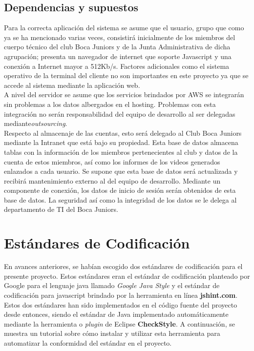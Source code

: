\documentclass[a4paper]{article}
\newcommand\tab[1][0.55cm]{\hspace*{#1}}
\begin{document}
{\color{Blue}
\subsection{Dependencias y supuestos}
\color{black}  %
\justify 

	\tab Para la correcta aplicación del sistema se asume que el usuario, grupo que como ya se ha mencionado varias veces, consistirá inicialmente de los miembros del cuerpo técnico del club Boca Juniors y de la Junta Administrativa de dicha agrupación;  presenta un navegador de internet que soporte Javascript y una conexión a Internet mayor a 512Kb/s. Factores adicionales como el sistema operativo de la terminal del cliente no son importantes en este proyecto ya que se accede al sistema mediante la aplicación web. \\
    
    A nivel del servidor se asume que los servicios brindados por AWS se integrarán sin problemas a los datos albergados en el hosting. Problemas con esta integración no serán responsabilidad del equipo de desarrollo al ser delegadas mediante\textit{outsourcing}. \\
    
    Respecto al almacenaje de las cuentas, esto será delegado al Club Boca Juniors mediante la Intranet que está bajo su propiedad. Esta base de datos almacena tablas con la información de los miembros pertenecientes al club y datos de la cuenta de estos miembros, así como los informes de los videos generados enlazados a cada usuario. Se supone que esta base de datos será actualizada y recibirá mantenimiento externo al del equipo de desarrollo. Mediante un componente de conexión, los datos de inicio de sesión serán obtenidos de esta base de datos. La seguridad así como la integridad de los datos se le delega al departamento de TI del Boca Juniors. 


\newpage
\color{Blue}
\section{\textbf{Estándares de Codificación}}
\color{black}
\justify 

\tab En avances anteriores, se habían escogido dos estándares de codificación para el presente proyecto. Estos estándares eran el estándar de codificación planteado por Google para el lenguaje java llamado \textit{Google Java Style} y el estándar de codificación para javascript brindado por la herramienta en línea \textbf{jshint.com}. Estos dos estándares han sido implementados en el código fuente del proyecto desde entonces, siendo el estándar de Java implementado automáticamente mediante la herramienta o \textit{plugin} de Eclipse \textbf{CheckStyle}. A continuación, se muestra un tutorial sobre cómo instalar y utilizar esta herramienta para automatizar la conformidad del estándar en el proyecto. 

}
\end{document}
